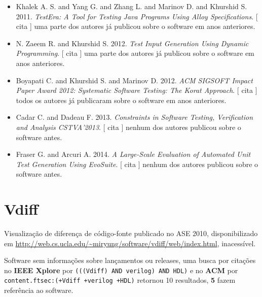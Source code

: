 \begin{itemize}
      [
          cita
      ]
uma parte dos autores já publicou sobre o software em anos anteriores.
\item Khalek A. S. and Yang G. and Zhang L. and Marinov D. and Khurshid S.
      2011.
        \textit{ TestEra: A Tool for Testing Java Programs Using Alloy Specifications}.
      [
          cita
      ]
uma parte dos autores já publicou sobre o software em anos anteriores.
\item N. Zaeem R. and Khurshid S.
      2012.
        \textit{ Test Input Generation Using Dynamic Programming}.
      [
          cita
      ]
uma parte dos autores já publicou sobre o software em anos anteriores.
\item Boyapati C. and Khurshid S. and Marinov D.
      2012.
        \textit{ ACM SIGSOFT Impact Paper Award 2012: Systematic Software Testing: The Korat Approach}.
      [
          cita
      ]
todos os autores já publicaram sobre o software em anos anteriores.
\item Cadar C. and Dadeau F.
      2013.
        \textit{ Constraints in Software Testing, Verification and Analysis CSTVA'2013}.
      [
          cita
      ]
nenhum dos autores publicou sobre o software antes.
\item Fraser G. and Arcuri A.
      2014.
        \textit{ A Large-Scale Evaluation of Automated Unit Test Generation Using EvoSuite}.
      [
          cita
      ]
nenhum dos autores publicou sobre o software antes.
\end{itemize}
\section{Vdiff}

Visualização de diferença de código-fonte
publicado no ASE 2010,
disponibilizado em \url{http://web.cs.ucla.edu/~miryung/software/vdiff/web/index.html},
inacessível.

Software sem informações sobre lançamentos ou releases,
uma busca por citações no {\bf IEEE Xplore} por
\texttt{(((Vdiff) AND verilog) AND HDL)}
e no {\bf ACM} por
\texttt{content.ftsec:(+Vdiff +verilog +HDL)}
retornou
10 resultados,
{\bf 5} fazem referência ao software.

